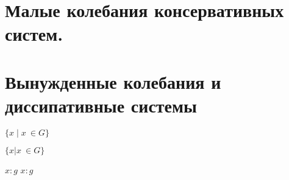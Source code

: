 


\section{Малые колебания консервативных систем.}

% 

\section{Вынужденные колебания и диссипативные системы}


\newpage

$\{x \mid x\ \in G\}$ 

$\{x | x\ \in G\}$


$x \colon  g$
$x : g$


